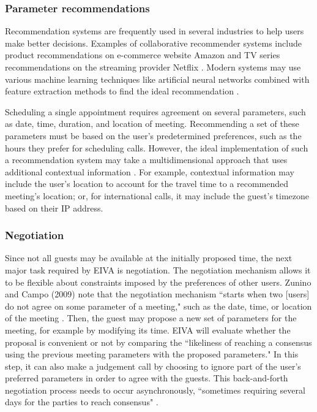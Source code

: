 \documentclass{article}
\begin{document}
\subsubsection{Parameter recommendations}

Recommendation systems are frequently used in several industries to help users make better decisions. Examples of collaborative recommender systems include product recommendations on e-commerce website Amazon \cite{linden_amazon.com_2003} and TV series recommendations on the streaming provider Netflix \cite{gomez-uribe_netflix_2016}. Modern systems may use various machine learning techniques like artificial neural networks combined with feature extraction methods to find the ideal recommendation \cite{adomavicius_toward_2005}.

Scheduling a single appointment requires agreement on several parameters, such as date, time, duration, and location of meeting. Recommending a set of these parameters must be based on the user's predetermined preferences, such as the hours they prefer for scheduling calls. However, the ideal implementation of such a recommendation system may take a multidimensional approach that uses additional contextual information \cite{adomavicius_incorporating_2005}. For example, contextual information may include the user's location to account for the travel time to a recommended meeting's location; or, for international calls, it may include the guest's timezone based on their IP address.

\subsubsection{Negotiation}

Since not all guests may be available at the initially proposed time, the next major task required by EIVA is negotiation. The negotiation mechanism allows it to be flexible about constraints imposed by the preferences of other users. Zunino and Campo (2009) note that the negotiation mechanism ``starts when two [users] do not agree on some parameter of a meeting," such as the date, time, or location of the meeting \cite{zunino_chronos:_2009}. Then, the guest may propose a new set of parameters for the meeting, for example by modifying its time. EIVA will evaluate whether the proposal is convenient or not by comparing the ``likeliness of reaching a consensus using the previous meeting parameters with the proposed parameters." In this step, it can also make a judgement call by choosing to ignore part of the user's preferred parameters in order to agree with the guests. This back-and-forth negotiation process needs to occur asynchronously, ``sometimes requiring several days for the parties to reach consensus" \cite{cranshaw_calendar.help:_2017}.
\end{document}
